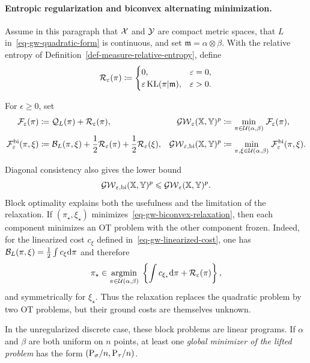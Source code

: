 \paragraph{Entropic regularization and biconvex alternating minimization.}
Assume in this paragraph that $\X$ and $\Y$ are compact metric spaces, that $L$ in~\eqref{eq-gw-quadratic-form} is continuous, and set $\mathfrak m=\alpha\otimes\beta$. With the relative entropy of Definition~\ref{def-measure-relative-entropy}, define
\[
\mathcal R_\epsilon(\pi)
\eqdef
\begin{cases}
0, & \epsilon=0,\\
\epsilon\KL(\pi|\mathfrak m), & \epsilon>0.
\end{cases}
\]
\begin{defn}\label{def-entropic-gw-biconvex}
For $\epsilon\geq0$, set
\begin{align}
\mathcal F_\epsilon(\pi)
&\eqdef \mathcal Q_L(\pi)+\mathcal R_\epsilon(\pi),
&
\GW_\epsilon(\XX,\YY)^p
&\eqdef \umin{\pi\in\Couplings(\alpha,\beta)}\mathcal F_\epsilon(\pi),
\label{eq-gw-entropic-general}\\
\mathcal F_\epsilon^{\mathrm{bi}}(\pi,\xi)
&\eqdef \mathcal B_L(\pi,\xi)
+\frac12\mathcal R_\epsilon(\pi)
+\frac12\mathcal R_\epsilon(\xi),
&
\GW_{\epsilon,\mathrm{bi}}(\XX,\YY)^p
&\eqdef \umin{\pi,\xi\in\Couplings(\alpha,\beta)}
\mathcal F_\epsilon^{\mathrm{bi}}(\pi,\xi).
\label{eq-gw-biconvex-relaxation}
\end{align}
\end{defn}
Diagonal consistency also gives the lower bound
\begin{equation}\label{eq-gw-biconvex-lower-bound}
\GW_{\epsilon,\mathrm{bi}}(\XX,\YY)^p
\leq
\GW_\epsilon(\XX,\YY)^p.
\end{equation}
Block optimality explains both the usefulness and the limitation of the relaxation. If $(\pi_\star,\xi_\star)$ minimizes~\eqref{eq-gw-biconvex-relaxation}, then each component minimizes an OT problem with the other component frozen. Indeed, for the linearized cost $c_\xi$ defined in~\eqref{eq-gw-linearized-cost}, one has $\mathcal B_L(\pi,\xi)=\frac12\int c_\xi\d\pi$ and therefore
\[
\pi_\star\in\uargmin{\pi\in\Couplings(\alpha,\beta)}
\left\{\int c_{\xi_\star}\d\pi+\mathcal R_\epsilon(\pi)\right\},
\]
and symmetrically for $\xi_\star$. Thus the relaxation replaces the quadratic problem by two OT problems, but their ground costs are themselves unknown.

In the unregularized discrete case, these block problems are linear programs. If $\alpha$ and $\beta$ are both uniform on $n$ points, at least one \emph{global minimizer of the lifted problem} has the form $(\P_\sigma/n,\P_\tau/n)$.


